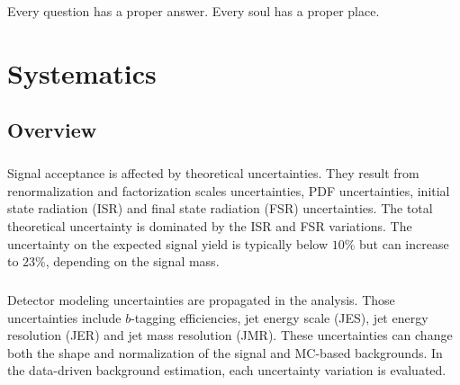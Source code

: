 \begin{savequote}[75mm]
Every question has a proper answer. Every soul has a proper place.
\end{savequote}

\chapter{Systematics}
\label{sec:systematics}


\section{Overview}

\paragraph{}
Signal acceptance is affected by theoretical uncertainties.
They result from renormalization and factorization scales uncertainties, PDF uncertainties, initial state radiation (ISR) and final state radiation (FSR) uncertainties.
The total theoretical uncertainty is dominated by the ISR and FSR variations.
The uncertainty on the expected signal yield is typically below $10\%$ but can increase to $23\%$, depending on the signal mass.

\paragraph{}
Detector modeling uncertainties are propagated in the analysis.
Those uncertainties include $b$-tagging efficiencies, jet energy scale (JES), jet energy resolution (JER) and jet mass resolution (JMR). 
These uncertainties can change both the shape and normalization of the signal and MC-based backgrounds. 
In the data-driven background estimation, each uncertainty variation is evaluated.

